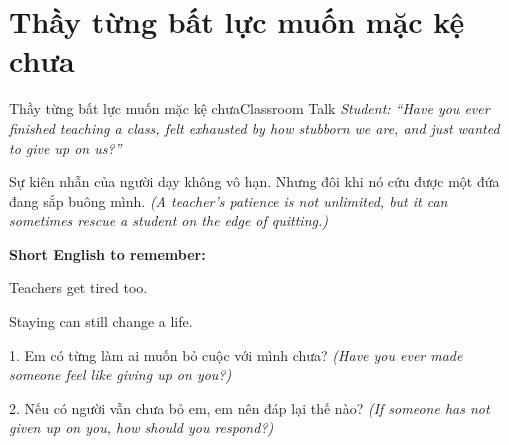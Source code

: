 \section{Thầy từng bất lực muốn mặc kệ chưa}
\begin{truyen}{Thầy từng bất lực muốn mặc kệ chưa}{Classroom Talk}
\textit{Student: ``Have you ever finished teaching a class, felt exhausted by how stubborn we are, and just wanted to give up on us?''}\\[4pt]



\end{truyen}

\begin{baihoc}
Sự kiên nhẫn của người dạy không vô hạn. Nhưng đôi khi nó cứu được một đứa đang sắp buông mình.
\textit{(A teacher’s patience is not unlimited, but it can sometimes rescue a student on the edge of quitting.)}
\end{baihoc}

\begin{ghinhoanh}
\textbf{Short English to remember:}

Teachers get tired too.

Staying can still change a life.
\end{ghinhoanh}

\begin{tuhocnhanh}
1. Em có từng làm ai muốn bỏ cuộc với mình chưa? \textit{(Have you ever made someone feel like giving up on you?)}

2. Nếu có người vẫn chưa bỏ em, em nên đáp lại thế nào? \textit{(If someone has not given up on you, how should you respond?)}
\end{tuhocnhanh}
\ngancach

